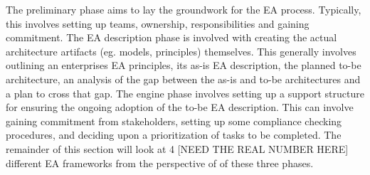The preliminary phase aims to lay the groundwork for the EA process. Typically, this involves setting up teams, ownership, responsibilities and gaining commitment. The EA description phase is involved with creating the actual architecture artifacts (eg. models, principles) themselves. This generally involves outlining an enterprises EA principles, its as-is EA description,  the planned to-be architecture, an analysis of the gap between the as-is and to-be architectures and a plan to cross that gap. The engine  phase involves setting up a support structure for ensuring the ongoing adoption of the to-be EA description. This can involve gaining commitment from stakeholders, setting up some compliance checking procedures, and deciding upon a prioritization of tasks to be completed. The remainder of this section will look at 4 [NEED THE REAL NUMBER HERE] different EA frameworks from the perspective of of these three phases. 



% 
% 
% 

% 

